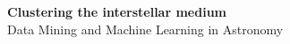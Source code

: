 \begingroup
\thispagestyle{empty}
\centering
\vspace*{5cm}
\par\normalfont\fontsize{35}{35}\sffamily\selectfont
\textbf{Clustering the interstellar medium}\\
{\LARGE Data Mining and Machine Learning in Astronomy}\par %
\vspace*{1cm}
\endgroup
